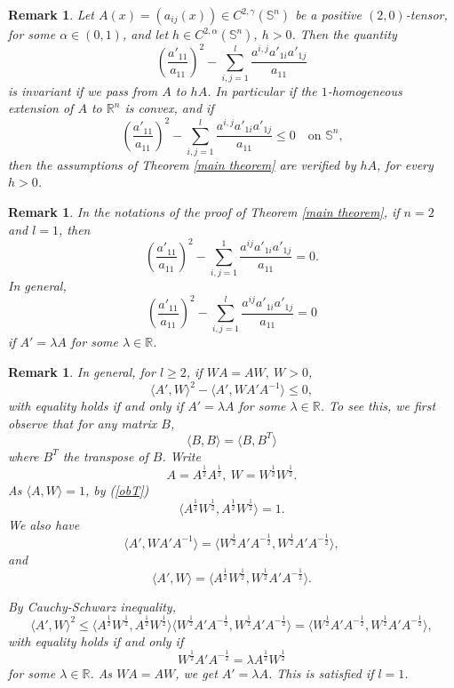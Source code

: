\documentclass[12pt]{amsart}
\newtheorem{remark}[theorem]{Remark}
\newcommand{\R}{\mathbb R}
\newcommand{\1}{\mathbf 1}
\newcommand{\s}{\mathbb S}
\newcommand{\sfe}{{{\mathbb S}^{n}}}
\begin{document}
\begin{remark} %
Let $A(x)=(a_{ij}(x))\in C^{2,\gamma}(\s^n)$ be a positive $(2,0)$-tensor, for some $\alpha\in(0,1)$, and let $h\in C^{2,\alpha}(\sfe)$, $h>0$. Then the quantity
\begin{equation*}
\left(\frac{a'_{11}}{a_{11}}\right)^2-\sum_{i,j=1}^l \frac{a^{i,j}a'_{1i}a'_{1j}}{a_{11}}
\end{equation*} 
is invariant if we pass from $A$ to $hA$.  
In particular if the $1$-homogeneous extension of $A$ to $\R^n$ is convex, and if
\begin{equation*}
\left(\frac{a'_{11}}{a_{11}}\right)^2-\sum_{i,j=1}^l \frac{a^{i,j}a'_{1i}a'_{1j}}{a_{11}}\le0\quad\mbox{on $\sfe$,}
\end{equation*} 
then the assumptions of Theorem \ref{main theorem} are verified by $hA$, for every $h>0$.
\end{remark}

\begin{remark} In the notations of the proof of Theorem \ref{main theorem}, if $n=2$ and $l=1$, then  
\begin{equation}
\left(\frac{a'_{11}}{a_{11}}\right)^2-\sum_{i,j=1}^1 \frac{a^{ij}a'_{1i}a'_{1j}}{a_{11}}=0.
\end{equation}
In general, 
\begin{equation}
\left(\frac{a'_{11}}{a_{11}}\right)^2-\sum_{i,j=1}^l \frac{a^{ij}a'_{1i}a'_{1j}}{a_{11}}=0
\end{equation} 
if $A'=\lambda A$ for some $\lambda\in \mathbb R$.

\end{remark}
\begin{remark} 
In general, for $l\ge 2$, if $WA=AW, \ W>0$, 
\[\langle A',W\rangle^2-\langle A', WA'A^{-1}\rangle\le 0,\] with equality holds if and only if $A'=\lambda A$ for some $\lambda\in \mathbb R$. To see this, we first observe that for any matrix $B$, 
\begin{equation}\label{obT}
\langle B, B\rangle=\langle B, B^T\rangle 
\end{equation} 
where $B^T$ the transpose of $B$. Write 
\[A=A^{\frac12}A^{\frac12}, \ W=W^{\frac12}W^{\frac12}.\] As $\langle A, W\rangle =1$, by (\ref{obT})
\[\langle A^{\frac12}W^{\frac12}, A^{\frac12}W^{\frac12}\rangle =1.\]We also have  
\[\langle A',WA'A^{-1}\rangle =\langle W^{\frac12}A'A^{-\frac12}, W^{\frac12}A'A^{-\frac12}\rangle,\] and
\[\langle A',W\rangle =\langle A^{\frac12}W^{\frac12}, W^{\frac12}A'A^{-\frac12}\rangle.\]

By Cauchy-Schwarz inequality,
\[\langle A',W\rangle^2\le \langle A^{\frac12}W^{\frac12}, A^{\frac12}W^{\frac12}\rangle \langle W^{\frac12}A'A^{-\frac12}, W^{\frac12}A'A^{-\frac12}\rangle=\langle W^{\frac12}A'A^{-\frac12}, W^{\frac12}A'A^{-\frac12}\rangle, \] with equality holds if and only if 
\[W^{\frac12}A'A^{-\frac12}=\lambda A^{\frac12}W^{\frac12} \] for some $\lambda\in \mathbb R$. As $WA=AW$, we get $A'=\lambda A$. This is satisfied if $l=1$.
\end{remark}
\end{document}
